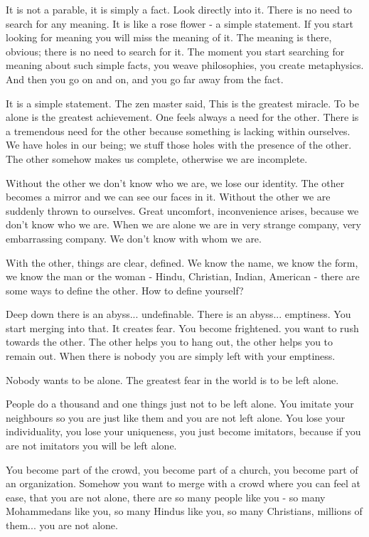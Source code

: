 It is not a parable, it is simply a fact. Look directly into it. There is no need to search for any meaning. It is like a rose flower - a simple statement. If you start looking for meaning you will miss the meaning of it. The meaning is there, obvious; there is no need to search for it. The moment you start searching for meaning about such simple facts, you weave philosophies, you create metaphysics. And then you go on and on, and you go far away from the fact.

It is a simple statement. The zen master said,  This is the greatest miracle. To be alone is the greatest achievement. One feels always a need for the other. There is a tremendous need for the other because something is lacking within ourselves. We have holes in our being; we stuff those holes with the presence of the other. The other somehow makes us complete, otherwise we are incomplete.

Without the other we don't know who we are, we lose our identity. The other becomes a mirror and we can see our faces in it. Without the other we are suddenly thrown to ourselves. Great uncomfort, inconvenience arises, because we don't know who we are. When we are alone we are in very strange company, very embarrassing company. We don't know with whom we are.

With the other, things are clear, defined. We know the name, we know the form, we know the man or the woman - Hindu, Christian, Indian, American - there are some ways to define the other. How to define yourself?

Deep down there is an abyss... undefinable. There is an abyss... emptiness. You start merging into that. It creates fear. You become frightened. you want to rush towards the other. The other helps you to hang out, the other helps you to remain out. When there is nobody you are simply left with your emptiness.

Nobody wants to be alone. The greatest fear in the world is to be left alone.

People do a thousand and one things just not to be left alone. You imitate your neighbours so you are just like them and you are not left alone. You lose your individuality, you lose your uniqueness, you just become imitators, because if you are not imitators you will be left alone.

You become part of the crowd, you become part of a church, you become part of an organization. Somehow you want to merge with a crowd where you can feel at ease, that you are not alone, there are so many people like you - so many Mohammedans like you, so many Hindus like you, so many Christians, millions of them... you are not alone.

